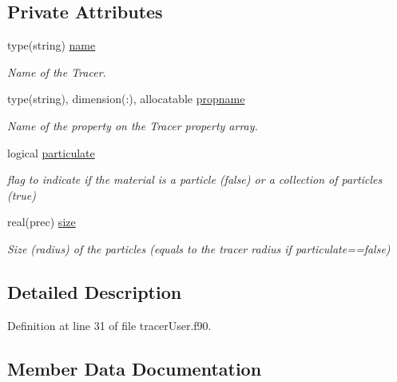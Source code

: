 \subsection*{Private Attributes}
\begin{DoxyCompactItemize}
\item 
type(string) \mbox{\hyperlink{structtraceruser__mod_1_1user__par__class_acd7b1fc4fb07e0aa2c7805bc0b89bcc9}{name}}
\begin{DoxyCompactList}\small\item\em Name of the Tracer. \end{DoxyCompactList}\item 
type(string), dimension(\+:), allocatable \mbox{\hyperlink{structtraceruser__mod_1_1user__par__class_a9d58d14629e986bbc4a837b3c3116bb9}{propname}}
\begin{DoxyCompactList}\small\item\em Name of the property on the Tracer property array. \end{DoxyCompactList}\item 
logical \mbox{\hyperlink{structtraceruser__mod_1_1user__par__class_ae217ac0567b650151963309dc107a33f}{particulate}}
\begin{DoxyCompactList}\small\item\em flag to indicate if the material is a particle (false) or a collection of particles (true) \end{DoxyCompactList}\item 
real(prec) \mbox{\hyperlink{structtraceruser__mod_1_1user__par__class_ac403ed1bb4162acf2704054f51026827}{size}}
\begin{DoxyCompactList}\small\item\em Size (radius) of the particles (equals to the tracer radius if particulate==false) \end{DoxyCompactList}\end{DoxyCompactItemize}


\subsection{Detailed Description}


Definition at line 31 of file tracer\+User.\+f90.



\subsection{Member Data Documentation}
\mbox{\label{structtraceruser__mod_1_1user__par__class_acd7b1fc4fb07e0aa2c7805bc0b89bcc9}} 
